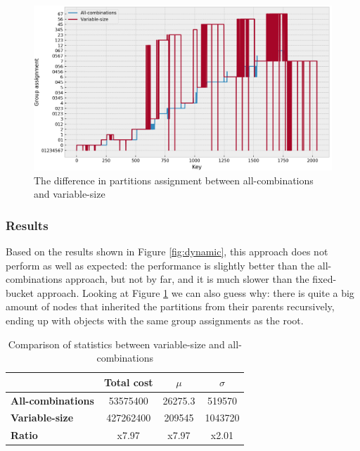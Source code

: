 \begin{figure}[!htb]
  \centering
  \includegraphics[width=\textwidth,height=\textheight,keepaspectratio]{img/partition_difference_variable_all.png}
  \caption{The difference in partitions assignment between all-combinations and variable-size}
  \label{fig:variable-partitioning}
\end{figure}

\subsubsection{Results}
Based on the results shown in Figure \ref{fig:dynamic}, this approach does not perform as well as expected: the performance is slightly better than the all-combinations approach, but not by far, and it is much slower than the fixed-bucket approach.
Looking at Figure \ref{fig:variable-partitioning} we can also guess why: there is quite a big amount of nodes that inherited the partitions from their parents recursively, ending up with objects with the same group assignments as the root. 

\begin{table}[!htb]
  \centering
  \begin{tabular}{l c c c}
    \hline
    & \textbf{Total cost} & \textbf{$\mu$} & \textbf{$\sigma$} \\
    \hline
    \textbf{All-combinations} & 53575400 & 26275.3 & 519570\\
    \textbf{Variable-size} & 427262400 & 209545 & 1043720 \\
    \hline
    \textbf{Ratio} & x7.97 & x7.97 & x2.01 \\
    \hline
  \end{tabular}
  \caption{Comparison of statistics between variable-size and all-combinations}\label{tab:mean-stddev-variable-all}
\end{table}

